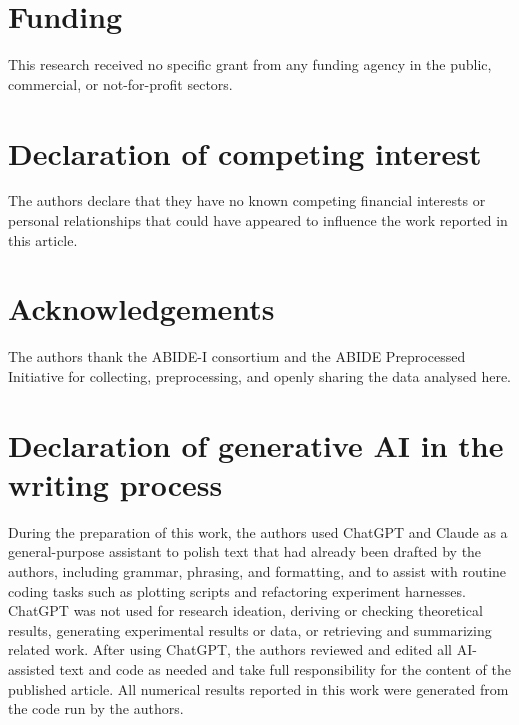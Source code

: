 \documentclass[a4paper,fleqn]{cas-sc}
\begin{document}
\section*{Funding}
This research received no specific grant from any funding agency in the public, commercial, or
not-for-profit sectors.

\section*{Declaration of competing interest}
The authors declare that they have no known competing financial interests or personal
relationships that could have appeared to influence the work reported in this article.

\section*{Acknowledgements}
The authors thank the ABIDE-I consortium and the ABIDE Preprocessed Initiative for collecting,
preprocessing, and openly sharing the data analysed here.

\section*{Declaration of generative AI in the writing process}

During the preparation of this work, the authors used ChatGPT and Claude as a general-purpose assistant to polish text that had already been drafted by the authors, including grammar, phrasing, and formatting, and to assist with routine coding tasks such as plotting scripts and refactoring experiment harnesses. ChatGPT was not used for research ideation, deriving or checking theoretical results, generating experimental results or data, or retrieving and summarizing related work. After using ChatGPT, the authors reviewed and edited all AI-assisted text and code as needed and take full responsibility for the content of the published article. All numerical results reported in this work were generated from the code run by the authors.



\end{document}
